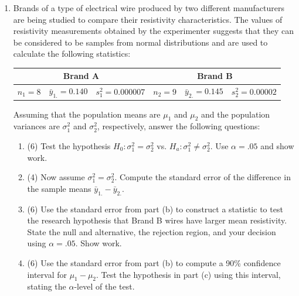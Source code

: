 \documentclass[11pt]{article}
\begin{document}
\begin{enumerate}
\item Brands of a type of electrical wire produced by two different manufacturers are being studied to compare their resistivity characteristics. The  values of resistivity measurements obtained by the experimenter suggests that they can be considered to be samples from normal distributions and are used to calculate the following  statistics:
\vspace*{-.2in}
\begin{center}
      \begin{tabular}{lll|lll} \hline
      \multicolumn{3}{c|}{Brand A} & \multicolumn{3}{c}{Brand B} \\ \hline
        $n_1 = 8$ & $\bar{y}_{1.} = 0.140 $ & $s_1^2 = 0.000007$ & $n_2 = 9$  & $\bar{y}_{2.} =0.145 $ & $s_2^2 = 0.00002$\\ \hline 
      \end{tabular}
      \end{center}
\vspace*{-.1in}
Assuming that the population means are $\mu_1$ and $\mu_2$ and the population variances are $\sigma_1^2$ and $\sigma_2^2$, respectively, answer the following questions:\\[-.1in]
  \begin{enumerate}
\item (6) Test the hypothesis $H_0: \sigma_1^2 =
 \sigma_2^2$ vs. $H_a: \sigma_1^2 \neq \sigma_2^2$.  Use $\alpha = .05$ and show work.\\[2in]
\item (4) Now assume $\sigma_1^2 = \sigma_2^2$. Compute the standard error of the
 difference in the sample means $\bar{y}_{1.} - \bar{y}_{2.}$.
 \newpage
\item (6) Use the standard error from part (b) to construct a statistic to test the research hypothesis that 
Brand B wires have larger mean resistivity. State the null and alternative, the rejection 
region, and your decision using $\alpha =.05$. Show work.\\[2in]
\item (6) Use the standard error from part (b) to compute a 90\% confidence
interval for $\mu_1 - \mu_2$.  Test the hypothesis in part (c) using this interval, stating the 
$\alpha$-level of the test.\\[2in]

 
 

\end{enumerate}
\end{enumerate}
\end{document}
